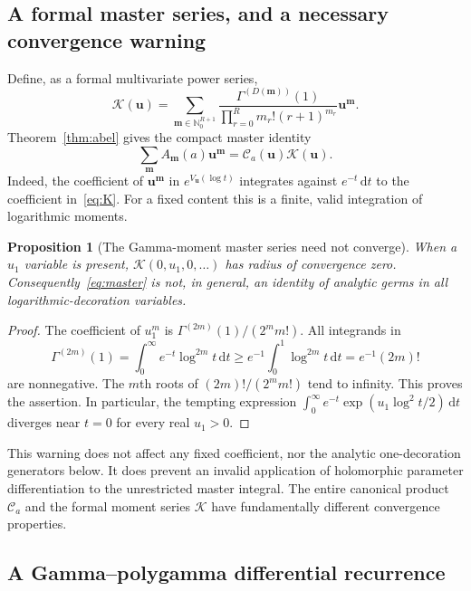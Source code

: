 \documentclass[11pt,oneside]{article}
\numberwithin{equation}{section}
\newtheorem{proposition}[theorem]{Proposition}
\theoremstyle{definition}
\theoremstyle{remark}
\newcommand{\dd}{\,\mathrm d}
\newcommand{\N}{\mathbb N}
\newcommand{\uu}{\mathbf u}
\newcommand{\mm}{\mathbf m}
\newcommand{\CC}{\mathcal C}
\newcommand{\KK}{\mathcal K}
\begin{document}
\subsection{A formal master series, and a necessary convergence warning}

Define, as a formal multivariate power series,
\begin{equation}\label{eq:K}
\KK(\uu)=\sum_{\mm\in\N_0^{R+1}}
 \frac{\Gamma^{(D(\mm))}(1)}
      {\prod_{r=0}^R m_r!(r+1)^{m_r}}\uu^{\mm}.
\end{equation}
Theorem~\ref{thm:abel} gives the compact master identity
\begin{equation}\label{eq:master}
\boxed{\displaystyle
\sum_{\mm}A_{\mm}(a)\uu^{\mm}=\CC_a(\uu)\KK(\uu).}
\end{equation}
Indeed, the coefficient of $\uu^{\mm}$ in $e^{V_{\uu}(\log t)}$ integrates
against $e^{-t}\dd t$ to the coefficient in~\eqref{eq:K}. For a fixed content
this is a finite, valid integration of logarithmic moments.

\begin{proposition}[The Gamma-moment master series need not converge]
\label{prop:formal}
When a $u_1$ variable is present, $\KK(0,u_1,0,\ldots)$ has radius of
convergence zero. Consequently~\eqref{eq:master} is not, in general, an
identity of analytic germs in all logarithmic-decoration variables.
\end{proposition}

\begin{proof}
The coefficient of $u_1^m$ is $\Gamma^{(2m)}(1)/(2^m m!)$. All integrands in
\[
\Gamma^{(2m)}(1)=\int_0^\infty e^{-t}\log^{2m}t\dd t
\ge e^{-1}\int_0^1\log^{2m}t\dd t=e^{-1}(2m)!
\]
are nonnegative. The $m$th roots of $(2m)!/(2^m m!)$ tend to infinity.
This proves the assertion. In particular, the tempting expression
$\int_0^\infty e^{-t}\exp(u_1\log^2t/2)\dd t$ diverges near $t=0$ for every
real $u_1>0$.
\end{proof}

This warning does not affect any fixed coefficient, nor the analytic
one-decoration generators below. It does prevent an invalid application of
holomorphic parameter differentiation to the unrestricted master integral.
The entire canonical product $\CC_a$ and the formal moment series $\KK$ have
fundamentally different convergence properties.

\subsection{A Gamma--polygamma differential recurrence}
\end{document}
